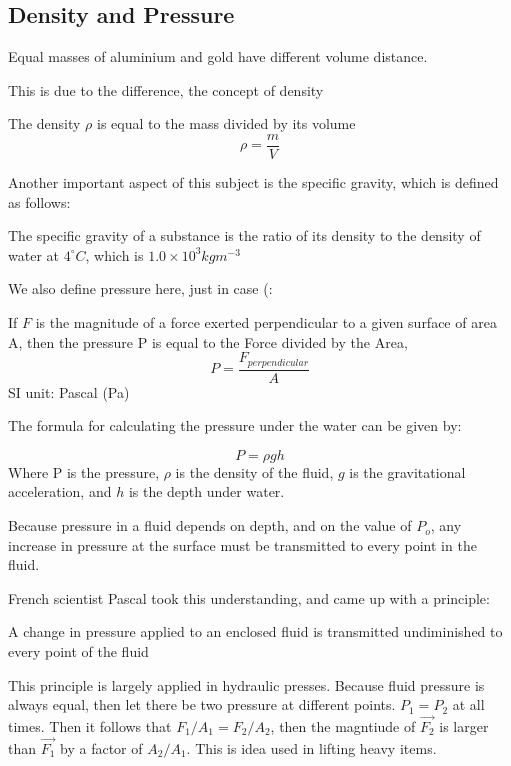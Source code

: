 \subsection{Density and Pressure}
Equal masses of aluminium and gold have different volume distance.

This is due to the difference, the concept of density
\begin{defi}[Density]
The density $\rho$ is equal to the mass divided by its volume
$$\rho=\frac{m}{V}$$
\end{defi}

Another important aspect of this subject is the specific gravity, which is defined as follows:

\begin{defi}
The specific gravity of a substance is the ratio of its density to the density of water at $4^\circ C$, which is $1.0 \times 10^3 kg m^{-3}$
\end{defi}

We also define pressure here, just in case (:
\begin{defi}[Pressure]
If $F$ is the magnitude of a force exerted perpendicular to a given surface of area A, then the pressure P is equal to the Force divided by the Area,
$$P=\frac{F_{perpendicular}}{A}$$
SI unit: Pascal (Pa)
\end{defi}

The formula for calculating the pressure under the water can be given by:
\begin{form}
$$P=\rho g h$$
Where P is the pressure, $\rho$ is the density of the fluid, $g$ is the gravitational acceleration, and $h$ is the depth under water.
\end{form}

Because pressure in a fluid depends on depth, and on the value of $P_o$, any increase in pressure at the surface must be transmitted to every point in the fluid.

French scientist Pascal took this understanding, and came up with a principle:
\begin{defi}
A change in pressure applied to an enclosed fluid is transmitted undiminished to every point of the fluid
\end{defi}

This principle is largely applied in hydraulic presses. Because fluid pressure is always equal, then let there be two pressure at different points. $P_1 = P_2$ at all times. Then it follows that $F_1/A_1 = F_2/A_2$, then the magntiude of $\vec{F_2}$ is larger than $\vec{F_1}$ by a factor of $A_2/A_1$. This is idea used in lifting heavy items.

